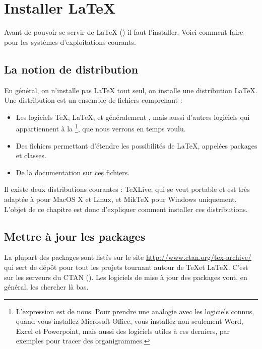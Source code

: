 \chapter {Installer \LaTeX{}}\label{install}

\begin{prealable}
	Avant de pouvoir se servir de \LaTeX{} (\XeLaTeX) il faut l'installer. Voici comment faire pour les systèmes d'exploitations courants.
\end{prealable}

\section{La notion de distribution}

En général, on n'installe pas \LaTeX{} tout seul, on installe une distribution \LaTeX{}. Une distribution est un ensemble de fichiers comprenant :
\begin{itemize}
\item Les logiciels \TeX, \LaTeX, et généralement \XeLaTeX, mais aussi d'autres logiciels qui appartiennent à la  \footnote{L'expression est de nous. Pour prendre une analogie avec les logiciels connus, quand vous installez Microsoft Office, vous installez non seulement Word, Excel et Powerpoint, mais aussi des logiciels utiles à ces derniers, par exemples pour tracer des organigrammes.}, que nous verrons en temps voulu.
\item Des fichiers permettant d'étendre les possibilités de \LaTeX, appelées packages et classes.
\item De la documentation sur ces fichiers.
\end{itemize}

Il existe deux distributions courantes : TeXLive, qui se veut portable et est très adaptée à pour MacOS X et Linux, et MikTeX pour Windows uniquement. L'objet de ce chapitre est donc d'expliquer comment installer ces distributions.





\section{Mettre à jour les packages}

La plupart des packages sont listés sur le site \url{http://www.ctan.org/tex-archive/} qui sert de dépôt pour tout les projets tournant autour de \TeX et \LaTeX. C'est sur les serveurs du CTAN (). Les logiciels de mise à jour des packages vont, en général, les chercher là bas.

